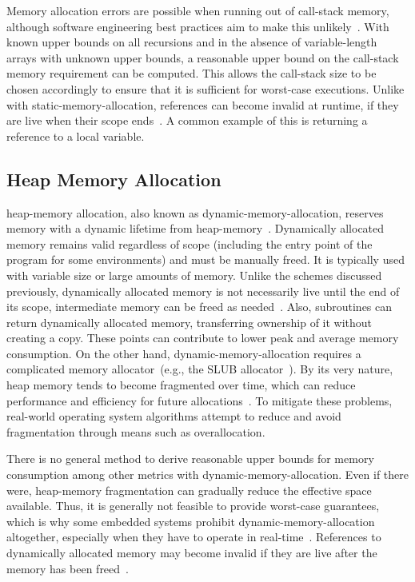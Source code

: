 Memory allocation errors are possible when running out of \gls{call-stack} memory, although software engineering best practices aim to make this unlikely~\cite{misra-2012}. With known upper bounds on all recursions and in the absence of variable-length arrays with unknown upper bounds, a reasonable upper bound on the \gls{call-stack} memory requirement can be computed. This allows the \gls{call-stack} size to be chosen accordingly to ensure that it is sufficient for worst-case executions. Unlike with \gls{static-memory-allocation}, references can become invalid at runtime, if they are live when their scope ends~\cite{ISO:2018:III}. A common example of this is returning a reference to a local variable.

\subsection{Heap Memory Allocation}
\label{sec:heap_mem_alloc}

\Gls{heap-memory} allocation, also known as \gls{dynamic-memory-allocation}, reserves memory with a dynamic lifetime from \gls{heap-memory}~\cite{os-concepts,ISO:2018:III,rust-ref}. Dynamically allocated memory remains valid regardless of scope (including the entry point of the program for some environments) and must be manually freed. It is typically used with variable size or large amounts of memory. Unlike the schemes discussed previously, dynamically allocated memory is not necessarily live until the end of its scope, intermediate memory can be freed as needed~\cite{ISO:2018:III}. Also, subroutines can return dynamically allocated memory, transferring ownership of it without creating a copy. These points can contribute to lower peak and average memory consumption. On the other hand, \gls{dynamic-memory-allocation} requires a complicated memory allocator~(e.g., the SLUB allocator~\cite{slub-alloc}). By its very nature, heap memory tends to become fragmented over time, which can reduce performance and efficiency for future allocations~\cite{slub-alloc}. To mitigate these problems, real-world operating system algorithms attempt to reduce and avoid fragmentation through means such as overallocation.

There is no general method to derive reasonable upper bounds for memory consumption among other metrics with \gls{dynamic-memory-allocation}. Even if there were, \gls{heap-memory} fragmentation can gradually reduce the effective space available. Thus, it is generally not feasible to provide worst-case guarantees, which is why some embedded systems prohibit \gls{dynamic-memory-allocation} altogether, especially when they have to operate in real-time~\cite{rt-dynmem}. References to dynamically allocated memory may become invalid if they are live after the memory has been freed~\cite{ISO:2018:III}.

